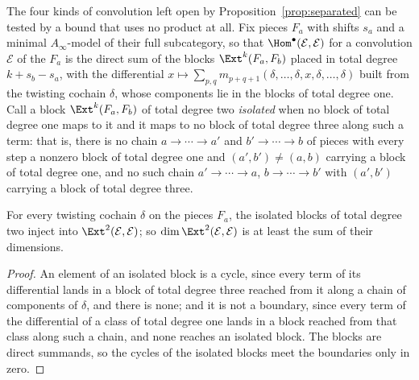 The four kinds of convolution left open by Proposition~\ref{prop:separated} can be tested by a bound that uses no product at all. Fix pieces $F_{a}$ with shifts $s_{a}$ and a minimal $A_{\infty}$-model of their full subcategory, so that $\Hom^{\bullet}(\mathcal{E},\mathcal{E})$ for a convolution $\mathcal{E}$ of the $F_{a}$ is the direct sum of the blocks $\Ext^{k}(F_{a},F_{b})$ placed in total degree $k+s_{b}-s_{a}$, with the differential $x\mapsto\sum_{p,q}m_{p+q+1}(\delta,\dots,\delta,x,\delta,\dots,\delta)$ built from the twisting cochain $\delta$, whose components lie in the blocks of total degree one. Call a block $\Ext^{k}(F_{a},F_{b})$ of total degree two \emph{isolated} when no block of total degree one maps to it and it maps to no block of total degree three along such a term: that is, there is no chain $a\to\cdots\to a'$ and $b'\to\cdots\to b$ of pieces with every step a nonzero block of total degree one and $(a',b')\ne(a,b)$ carrying a block of total degree one, and no such chain $a'\to\cdots\to a$, $b\to\cdots\to b'$ with $(a',b')$ carrying a block of total degree three.

\begin{lemma}\label{lem:isolated}
For every twisting cochain $\delta$ on the pieces $F_{a}$, the isolated blocks of total degree two inject into $\Ext^{2}(\mathcal{E},\mathcal{E})$; so $\dim\Ext^{2}(\mathcal{E},\mathcal{E})$ is at least the sum of their dimensions.
\end{lemma}

\begin{proof}
An element of an isolated block is a cycle, since every term of its differential lands in a block of total degree three reached from it along a chain of components of $\delta$, and there is none; and it is not a boundary, since every term of the differential of a class of total degree one lands in a block reached from that class along such a chain, and none reaches an isolated block. The blocks are direct summands, so the cycles of the isolated blocks meet the boundaries only in zero.
\end{proof}

